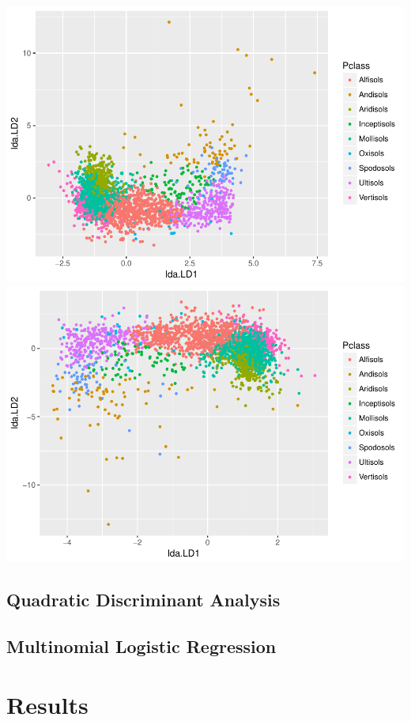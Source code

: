 \documentclass[]{article}
\begin{document}
\includegraphics{Project1_files/figure-latex/LDA - Fei-1.pdf}
\includegraphics{Project1_files/figure-latex/LDA - Fei-2.pdf}

\subsection{Quadratic Discriminant
Analysis}\label{quadratic-discriminant-analysis}

\subsection{Multinomial Logistic
Regression}\label{multinomial-logistic-regression}

\section{Results}\label{results}
\end{document}
